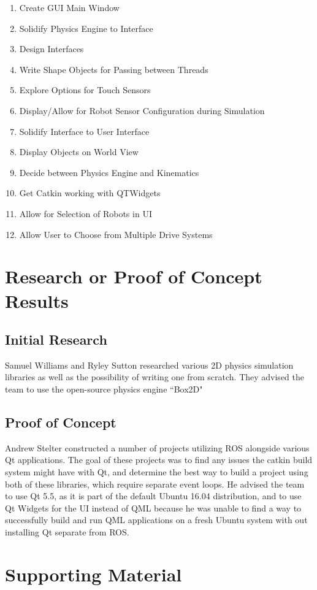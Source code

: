 \begin{itemize}
\begin{enumerate}
\item Create GUI Main Window
\item Solidify Physics Engine to Interface
\item Design Interfaces
\item Write Shape Objects for Passing between Threads
\item Explore Options for Touch Sensors
\item Display/Allow for Robot Sensor Configuration during Simulation
\item Solidify Interface to User Interface
\item Display Objects on World View
\item Decide between Physics Engine and Kinematics
\item Get Catkin working with QTWidgets
\item Allow for Selection of Robots in UI
\item Allow User to Choose from Multiple Drive Systems
\end{enumerate}
\end{itemize}

\section{Research or Proof of Concept Results}
\subsection{Initial Research}
Samuel Williams and Ryley Sutton researched various 2D physics simulation libraries as well as the possibility of writing one from scratch. They advised the team to use the open-source physics engine ``Box2D"

\subsection{Proof of Concept}
Andrew Stelter constructed a number of projects utilizing ROS alongside various Qt applications. The goal of these projects was to find any issues the catkin build system might have with Qt, and determine the best way to build a project using both of these libraries, which require separate event loops. He advised the team to use Qt 5.5, as it is part of the default Ubuntu 16.04 distribution, and to use Qt Widgets for the UI instead of QML because he was unable to find a way to successfully build and run QML applications on a fresh Ubuntu system with out installing Qt separate from ROS.

\section{Supporting Material}

